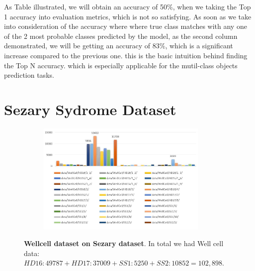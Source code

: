 As Table illustrated, we will obtain an accuracy of 50\%, when  we taking the Top 1 accuracy into evaluation metrics, which is not so satisfying. As soon as we take into consideration of the accuracy where where true class matches with any one of the 2 most probable classes predicted by the model, as the second column demonstrated, we will be getting an accuracy of 83\%, which is a significant increase compared to the previous one. this is the basic intuition behind finding the Top N accuracy. which is especially  applicable for the mutil-class objects prediction tasks.





\section{Sezary Sydrome Dataset}
\label{sec:lorem}

\begin{figure}[h]
	\begin{center}
		\begin{subfigure}[b]{\textwidth}
		    \centering
			\includegraphics[width=0.9\textwidth]{thesis-template-master/images/wellcellSezary dataset.JPG}
			\label{fig:cellnet}
		\end{subfigure}
	\end{center}
	\caption{\textbf{Wellcell dataset on Sezary dataset}. In total we had Well cell data:$HD16:49787+ HD17:37009+SS1:5250+SS2:10852= 102,898$.}
\end{figure}

